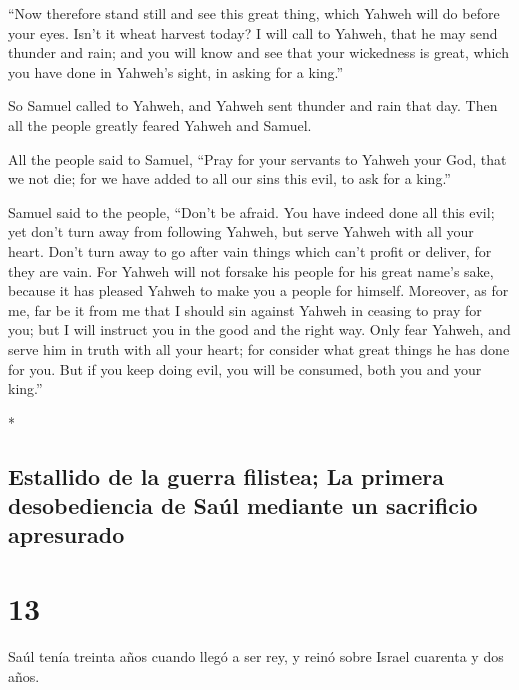 \begin{paracol}{2}
\begin{otherlanguage}{english}
 ``Now therefore stand still and see this great thing,
which Yahweh will do before your eyes.  Isn't it wheat
harvest today? I will call to Yahweh, that he may send thunder and rain;
and you will know and see that your wickedness is great, which you have
done in Yahweh's sight, in asking for a king.''

 So Samuel called to Yahweh, and Yahweh sent thunder and
rain that day. Then all the people greatly feared Yahweh and Samuel.

 All the people said to Samuel, ``Pray for your servants
to Yahweh your God, that we not die; for we have added to all our sins
this evil, to ask for a king.''

 Samuel said to the people, ``Don't be afraid. You have
indeed done all this evil; yet don't turn away from following Yahweh,
but serve Yahweh with all your heart.  Don't turn away to
go after vain things which can't profit or deliver, for they are vain.
 For Yahweh will not forsake his people for his great
name's sake, because it has pleased Yahweh to make you a people for
himself.  Moreover, as for me, far be it from me that I
should sin against Yahweh in ceasing to pray for you; but I will
instruct you in the good and the right way.  Only fear
Yahweh, and serve him in truth with all your heart; for consider what
great things he has done for you.  But if you keep doing
evil, you will be consumed, both you and your king.''

\end{otherlanguage}

\switchcolumn[0]*

\hypertarget{estallido-de-la-guerra-filistea-la-primera-desobediencia-de-sauxfal-mediante-un-sacrificio-apresurado}{%
\subsection{Estallido de la guerra filistea; La primera desobediencia de
Saúl mediante un sacrificio
apresurado}\label{estallido-de-la-guerra-filistea-la-primera-desobediencia-de-sauxfal-mediante-un-sacrificio-apresurado}}

\hypertarget{section-24}{%
\section{13}\label{section-24}}

 Saúl tenía treinta años cuando llegó a ser rey, y reinó
sobre Israel cuarenta y dos años.


\end{paracol}
